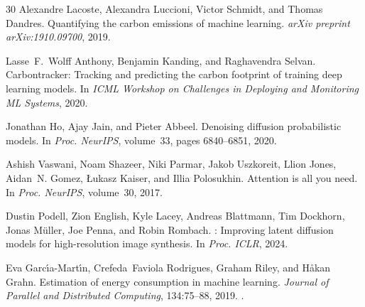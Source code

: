 \documentclass[acmlarge,manuscript,screen,review]{acmart}
\begin{document}
\begin{thebibliography}{30}
Alexandre Lacoste, Alexandra Luccioni, Victor Schmidt, and Thomas Dandres.
\newblock Quantifying the carbon emissions of machine learning.
\newblock \emph{arXiv preprint arXiv:1910.09700}, 2019.

Lasse~F.~Wolff Anthony, Benjamin Kanding, and Raghavendra Selvan.
\newblock Carbontracker: Tracking and predicting the carbon footprint of training deep learning models.
\newblock In \emph{ICML Workshop on Challenges in Deploying and Monitoring ML Systems}, 2020.

Jonathan Ho, Ajay Jain, and Pieter Abbeel.
\newblock Denoising diffusion probabilistic models.
\newblock In \emph{Proc. NeurIPS}, volume~33, pages 6840--6851, 2020.

Ashish Vaswani, Noam Shazeer, Niki Parmar, Jakob Uszkoreit, Llion Jones, Aidan~N. Gomez, {\L}ukasz Kaiser, and Illia Polosukhin.
\newblock Attention is all you need.
\newblock In \emph{Proc. NeurIPS}, volume~30, 2017.

Dustin Podell, Zion English, Kyle Lacey, Andreas Blattmann, Tim Dockhorn, Jonas M{\"u}ller, Joe Penna, and Robin Rombach.
: Improving latent diffusion models for high-resolution image synthesis.
\newblock In \emph{Proc. ICLR}, 2024.

Eva Garc{\'\i}a-Mart{\'\i}n, Crefeda~Faviola Rodrigues, Graham Riley, and H{\aa}kan Grahn.
\newblock Estimation of energy consumption in machine learning.
\newblock \emph{Journal of Parallel and Distributed Computing}, 134:75--88, 2019.
\newblock {}.

\end{thebibliography}
\end{document}
